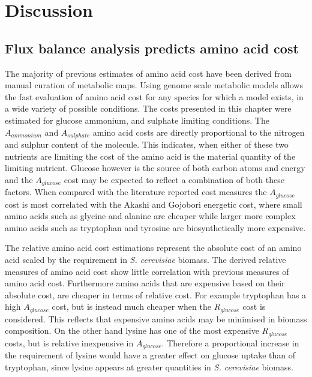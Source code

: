 \clearpage

\section{Discussion}%

\subsection{Flux balance analysis predicts amino acid cost}%

The majority of previous estimates of amino acid cost have been derived from manual curation of metabolic maps. Using genome scale metabolic models allows the fast evaluation of amino acid cost for any species for which a model exists, in a wide variety of possible conditions. The costs presented in this chapter were estimated for glucose ammonium, and sulphate limiting conditions. The $A_{ammonium}$ and $A_{sulphate}$ amino acid costs are directly proportional to the nitrogen and sulphur content of the molecule. This indicates, when either of these two nutrients are limiting the cost of the amino acid is the material quantity of the limiting nutrient. Glucose however is the source of both carbon atoms and energy and the $A_{glucose}$ cost may be expected to reflect a combination of both these factors. When compared with the literature reported cost measures the $A_{glucose}$ cost is most correlated with the Akashi and Gojobori energetic cost, where small amino acids such as glycine and alanine are cheaper while larger more complex amino acids such as tryptophan and tyrosine are biosynthetically more expensive.

The relative amino acid cost estimations represent the absolute cost of an amino acid scaled by the requirement in \emph{S. cerevisiae} biomass. The derived relative measures of amino acid cost show little correlation with previous measures of amino acid cost. Furthermore amino acids that are expensive based on their absolute cost, are cheaper in terms of relative cost. For example tryptophan has a high $A_{glucose}$ cost, but is instead much cheaper when the $R_{glucose}$ cost is considered. This reflects that expensive amino acids may be minimised in biomass composition. On the other hand lysine has one of the most expensive $R_{glucose}$ costs, but is relative inexpensive in $A_{glucose}$. Therefore a proportional increase in the requirement of lysine would have a greater effect on glucose uptake than of tryptophan, since lysine appears at greater quantities in \emph{S. cerevisiae} biomass.

